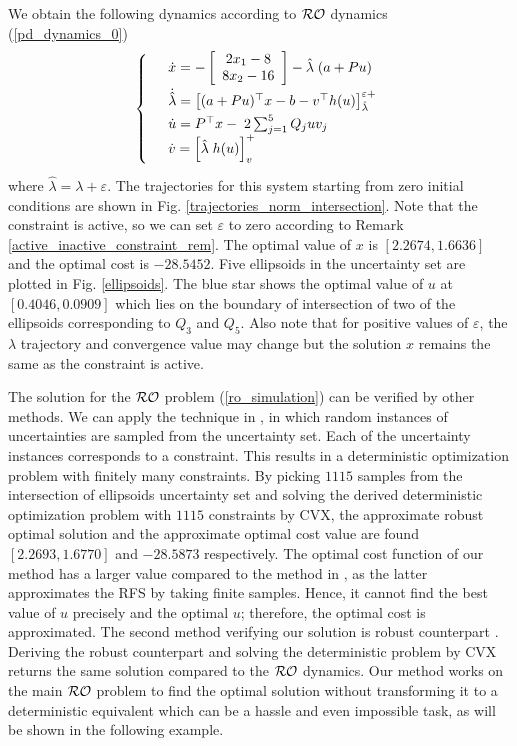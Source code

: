 \documentclass[journal,twoside,web]{ieeecolor}
\begin{document}
We obtain the following dynamics according to ${\cal RO}$ dynamics (\ref{pd_dynamics_0})
\begin{align*}
\left\{
\begin{array}{cl}
\vspace{1mm}
&\dot x=-\left[\begin{array}{ccl} 2x_1-8\\8x_2-16 \end{array}\right]-\hat{\lambda}\;(a+Pu)\\
\vspace{1mm}
&\dot {\hat{\lambda}} = \big[(a+Pu)^\top x-b-v ^\top h(u)\big]_{\hat{\lambda}}^{\varepsilon+}\\
&\dot u=P^\top x-\;2\sum_{j=1}^5 Q_j u v_{j}\\
\vspace{1mm}
&\dot v=\left[\hat{\lambda}\; h(u) \right]_{v}^+
\end{array}
\vspace{1mm}
\right.
\end{align*}
where $\hat{\lambda}=\lambda+\varepsilon$.
The trajectories for this system starting from zero initial conditions are shown in Fig. \ref{trajectories_norm_intersection}. Note that the constraint is active, so we can set $\varepsilon$ to zero according to Remark \ref{active_inactive_constraint_rem}. The optimal value of $x$ is $[2.2674,1.6636]$ and the optimal cost is $-28.5452$. Five ellipsoids in the uncertainty set are plotted in Fig. \ref{ellipsoids}. The blue star shows the optimal value of $u$ at $[0.4046,0.0909]$ which lies on the boundary of intersection of two of the ellipsoids corresponding to $Q_3$ and $Q_5$.
Also note that for positive values of $\varepsilon$, the $\lambda$ trajectory and convergence value may change but the solution $x$ remains the same as the constraint is active.

The solution for the ${\cal RO}$ problem (\ref{ro_simulation}) can be verified by other methods. We can apply the technique in \cite{calafiore2004}, in which random instances of uncertainties are sampled from the uncertainty set. Each of the uncertainty instances corresponds to a constraint. This results in a deterministic optimization problem with finitely many constraints.  By picking $1115$ samples from the intersection of ellipsoids uncertainty set and solving the derived deterministic optimization problem with $1115$ constraints by CVX, the approximate robust optimal solution and the approximate optimal cost value are found $[2.2693, 1.6770]$ and $-28.5873$ respectively. The optimal cost function of our method has a larger value compared to the method in \cite{calafiore2004}, as the latter approximates the RFS by taking finite samples. Hence, it cannot find the best value of $u$ precisely and the optimal $u$; therefore, the optimal cost is approximated. The second method verifying our solution is robust counterpart \cite{bental2009}. Deriving the robust counterpart and solving the deterministic problem by CVX returns the same solution compared to the ${\cal RO}$ dynamics. Our method works on the main ${\cal RO}$ problem to find the optimal solution without transforming it to a deterministic equivalent which can be a hassle and even impossible task, as will be shown in the following example.
\end{document}
